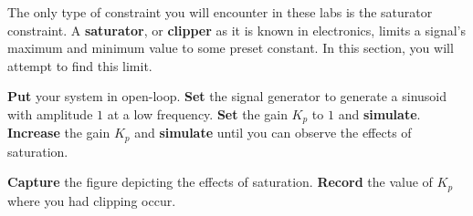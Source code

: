 The only type of constraint you will encounter in these labs is the saturator
constraint. A \textbf{saturator}, or \textbf{clipper} as it is known in
electronics, limits a signal's maximum and minimum value to some preset
constant. In this section, you will attempt to find this limit.
%
\begin{procedure}[label={proc:lab1:p6}]
  \textbf{Put} your system in open-loop. \textbf{Set} the signal generator to
  generate a sinusoid with amplitude \(1\) at a low frequency.
  \textbf{Set} the gain \(K_p\) to \(1\) and \textbf{simulate}.
  \textbf{Increase} the gain \(K_p\) and \textbf{simulate} until you can
  observe the effects of saturation.
\end{procedure}
%
\begin{deliverable}[label={lab1:d6}]
  \textbf{Capture} the figure depicting the effects of saturation.
  \textbf{Record} the value of \(K_p\) where you had clipping occur.
\end{deliverable}


